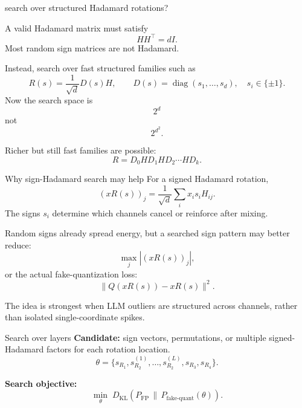 \documentclass[aspectratio=169,11pt]{beamer}
\newcommand{\KL}{D_{\mathrm{KL}}}
\newcommand{\diag}{\operatorname{diag}}
\begin{document}

\begin{frame}{search over structured Hadamard rotations?}

  \vspace{0.2cm}
A valid Hadamard matrix must satisfy
\[
HH^\top = dI.
\]
Most random sign matrices are not Hadamard.

\vspace{0.2cm}
Instead, search over fast structured families such as
\[
R(s) = \frac{1}{\sqrt d} D(s)H,
\qquad
D(s)=\diag(s_1,\ldots,s_d),\quad s_i\in\{\pm1\}.
\]
Now the search space is
\[
2^d
\]
not
\[
2^{d^2}.
\]

\vspace{0.2cm}
Richer but still fast families are possible:
\[
R = D_0 H D_1 H D_2 \cdots H D_k.
\]
\end{frame}

\begin{frame}{Why sign-Hadamard search may help}
For a signed Hadamard rotation,
\[
(xR(s))_j = \frac{1}{\sqrt d}\sum_i x_i s_i H_{ij}.
\]
The signs $s_i$ determine which channels cancel or reinforce after mixing.

\vspace{0.2cm}
Random signs already spread energy, but a searched sign pattern may better reduce:
\[
\max_j |(xR(s))_j|,
\]
or the actual fake-quantization loss:
\[
\|Q(xR(s)) - xR(s)\|^2.
\]

\vspace{0.2cm}
The idea is strongest when LLM outliers are structured across channels, rather than isolated single-coordinate spikes.
\end{frame}

\begin{frame}{Search over layers}
\textbf{Candidate:} sign vectors, permutations, or multiple signed-Hadamard factors for each rotation location.
\[
\theta = \{s_{R_1}, s_{R_2}^{(1)},\ldots,s_{R_2}^{(L)}, s_{R_3}, s_{R_4}\}.
\]

\vspace{0.2cm}
\textbf{Search objective:}
\[
\min_{\theta}\; \KL(P_{\mathrm{FP}}\,\|\,P_{\mathrm{fake\text{-}quant}}(\theta)).
\]

\vspace{0.2cm}
\end{frame}
\end{document}
